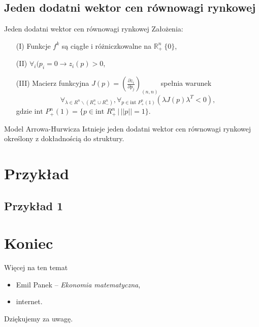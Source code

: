 \documentclass[a4paper, 11pt]{beamer}
\begin{document}
    \subsection{Jeden dodatni wektor cen równowagi rynkowej}
      \begin{frame}{Jeden dodatni wektor cen równowagi rynkowej}
	Założenia:
	\begin{enumerate}
	  \item[(I)] Funkcje $f^k$ są ciągłe i różniczkowalne na
	  $\mathbb{R}^n_{+} \ \{0\}$,

	  \item[(II)] $\forall_i (p_i = 0 \rightarrow z_i (p) > 0$,

	  \item[(III)] Macierz funkcyjna $J(p) = (\frac{\partial z_i}{\partial
	  p_j})_{(n, n)}$ spełnia warunek
	    $$\forall_{\lambda \in R^n \backslash (R^n_{+} \cup R^n_{-})}, \forall_{p \in
	    \text{int }P^n_{+}(1)} (\lambda J(p) \lambda^T < 0),$$
	    gdzie $\text{int }P^n_{+}(1) = \{p\in\text{int }R^n_{+}\, \big|\,
	    ||p||=1 \}$.
	\end{enumerate}

	\begin{block}{Model Arrowa-Hurwicza}
	  Istnieje jeden dodatni wektor cen równowagi rynkowej określony z
	  dokładnością do struktury.
	\end{block}
      \end{frame}

  \section{Przykład}
    \subsection{Przykład 1}

  \section*{Koniec}

    \begin{frame}{Więcej na ten temat}
      \begin{itemize}
	\item Emil Panek -- \textit{Ekonomia matematyczna},
	\item internet.
      \end{itemize}
    \end{frame}

    \begin{frame}
      \begin{center}
	Dziękujemy za uwagę.
      \end{center}
    \end{frame}
\end{document}
